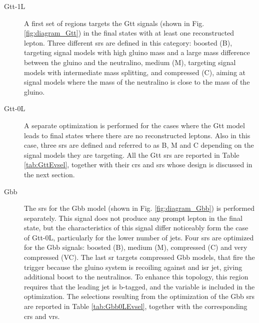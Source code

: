 \begin{description}

\item[Gtt-1L] A first set of regions targets the Gtt signals (shown in Fig. \ref{fig:diagram_Gtt}) in the final states with at least one reconstructed lepton. Three different \glspl{sr} are defined in this category: boosted (B), targeting signal models with high gluino mass 
and a large mass difference between the gluino and the neutralino, medium (M), targeting signal models with intermediate mass splitting, and compressed (C), aiming at signal models where the mass of the neutralino is close to the mass of the gluino. 

\item[Gtt-0L] A separate optimization is performed for the cases where the Gtt model leads to final states where there are no reconstructed leptons.
Also in this case, three \glspl{sr} are defined and referred to as B, M and C depending on the signal models they are targeting. 
All the Gtt \glspl{sr} are reported in Table \ref{tab:GttEvsel}, together with their \glspl{cr} and \glspl{sr} whose design is discussed in the next section. 

\item[Gbb] The \glspl{sr} for the Gbb model (shown in Fig. \ref{fig:diagram_Gbb}) is performed separately. 
This signal does not produce any prompt lepton in the final state, but the characteristics of this signal differ noticeably form 
the case of Gtt-0L, particularly for the lower number of jets. 
Four \glspl{sr} are optimized for the Gbb signals: boosted (B), medium (M), compressed (C) and very compressed (VC). 
The last \gls{sr} targets compressed Gbb models, that fire the \met trigger because the gluino system is recoiling against 
and \gls{isr} jet, giving additional boost to the neutralinos. To enhance this topology, this region requires that the leading jet is b-tagged, and 
the variable \dphilead is included in the optimization. The selections resulting from the optimization of the Gbb \glspl{sr} are 
reported in Table \ref{tab:Gbb0LEvsel}, together with the corresponding \glspl{cr} and \glspl{vr}.

\end{description}


